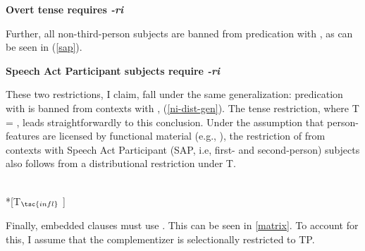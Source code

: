 \documentclass[12pt]{article}
\begin{document}
\bex
\ex \textbf{Overt tense requires \textit{-ri}} \label{tense}
\bxl
\fxl
\fex

Further, all non-third-person subjects are banned from predication with , as can be seen in (\ref{sap}).

\bex
\ex \textbf{Speech Act Participant subjects require \textit{-ri}} \label{sap}
\bxl
{}	
\fxl
\fex

These two restrictions, I claim, fall under the same generalization: predication with  is banned from contexts with , (\ref{ni-dist-gen}). The tense restriction, where T = , leads straightforwardly to this conclusion. Under the assumption that person-features are licensed by functional material (e.g., \citealt{bejar-rezac-2003}), the restriction of  from contexts with Speech Act Participant (SAP, i.e, first- and second-person) subjects also follows from a distributional restriction under T. 


\bex
\ex {} \label{ni-dist-gen}\\
{*}[T$_{\tsc{infl}}$ ]
\fex

Finally, embedded clauses must use . This can be seen in \ref{matrix}. To account for this, I assume that the complementizer is selectionally restricted to TP. 
\end{document}
